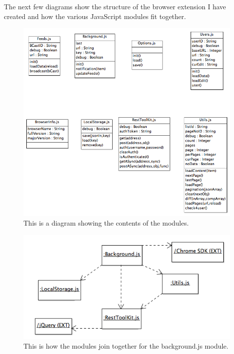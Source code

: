 \documentclass{article}
\begin{document}
The next few diagrams show the structure of the browser extension I have created and how the various JavaScript modules fit together.

\begin{figure}[H]
\centering
\includegraphics[width=\textwidth]{ClassDiagram}
\caption{This is a diagram showing the contents of the modules.}
\end{figure}

\begin{figure}[H]
\centering
\includegraphics[width=\textwidth]{bgclass}
\caption{This is how the modules join together for the background.js module.}
\end{figure}
\end{document}
